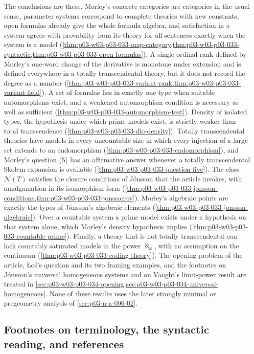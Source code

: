 The conclusions are these. Morley's concrete categories are categories in
the usual sense, parameter systems correspond to complete theories with
new constants, open formulas already give the whole formula algebra, and
satisfaction in a system agrees with provability from its theory for all
sentences exactly when the system is a model
(\cref{thm:p03-w03-p03-033-map-category,thm:p03-w03-p03-033-syntactic,thm:p03-w03-p03-033-open-formulas}).
A single ordinal rank defined by Morley's
one-word change of the derivative is monotone under extension and is
defined everywhere in a totally transcendental theory, but it does not
record the degree as a number (\cref{thm:p03-w03-p03-033-variant-rank,thm:p03-w03-p03-033-variant-field}).
A set of formulas lies in exactly one type when suitable automorphisms
exist, and a weakened automorphism condition is necessary as well as
sufficient (\cref{thm:p03-w03-p03-033-automorphism-test}). Density of
isolated types, the hypothesis under which prime models exist, is strictly
weaker than total transcendence (\cref{thm:p03-w03-p03-033-dlo-density}).
Totally transcendental theories have models in every uncountable size in
which every injection of a large set extends to an endomorphism
(\cref{thm:p03-w03-p03-033-endomorphism}), and Morley's question (5) has an
affirmative answer whenever a totally transcendental Skolem expansion is
available (\cref{thm:p03-w03-p03-033-question-five}). The class
\(\mathcal N(T)\) satisfies the closure conditions of Jónsson that the
article invokes, with amalgamation in its isomorphism form
(\cref{thm:p03-w03-p03-033-jonsson-conditions,thm:p03-w03-p03-033-jonsson-iv}).
Morley's algebraic points are exactly the types of Jónsson's algebraic
elements (\cref{thm:p03-w03-p03-033-jonsson-algebraic}). Over a countable
system a prime model exists under a hypothesis on that system alone, which
Morley's density hypothesis implies
(\cref{thm:p03-w03-p03-033-countable-prime}). Finally, a theory that is
not totally transcendental can lack countably saturated models in the
power \(\aleph_\omega\), with no assumption on the continuum
(\cref{thm:p03-w03-p03-033-coding-theory}). The opening problem of the
article, Łoś's question and its two framing examples, and the footnotes on
Jónsson's universal homogeneous systems and on Vaught's limit-power result
are treated in \cref{sec:p03-w03-p03-034-opening,sec:p03-w03-p03-034-universal-homogeneous}.
None of these results uses the later strongly minimal or pregeometry
analysis of \cref{sec:p03-n-a-006-02}.

\subsection{Footnotes on terminology, the syntactic reading, and references}
\label{sec:p03-w03-p03-033-early-footnotes}


